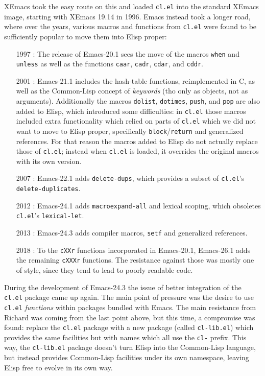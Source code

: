 \documentclass[format=acmsmall, review=false, screen=true]{acmart}
\newcommand \Elisp {Elisp}
\begin{document}
XEmacs took the easy route on this and loaded \texttt{cl.el} into the
standard XEmacs image, starting with XEmacs 19.14 in 1996.  Emacs instead
took a longer road, where over the years, various macros and functions from
\texttt{cl.el} were found to be sufficiently popular to move them into
\Elisp{} proper:

\begin{itemize}
\item [1997]: The release of Emacs-20.1 sees the move of the
  macros \texttt{when} and \texttt{unless} as well as the functions
  \texttt{caar}, \texttt{cadr}, \texttt{cdar}, and \texttt{cddr}.
\item [2001]: Emacs-21.1 includes the hash-table functions, reimplemented in
  C, as well as the Common-Lisp concept of \emph{keywords} (tho only as
  objects, not as arguments).  Additionally the macros \texttt{dolist},
  \texttt{dotimes}, \texttt{push}, and \texttt{pop} are also added to
  \Elisp{}, which introduced some difficulties: in \texttt{cl.el} those
  macros included extra functionality which relied on parts of
  \texttt{cl.el} which we did not want to move to \Elisp{} proper,
  specifically \texttt{block}/\texttt{return} and generalized references.
  For that reason the macros added to \Elisp{} do not actually replace those
  of \texttt{cl.el}; instead when \texttt{cl.el} is loaded, it overrides the
  original macros with its own version.
\item [2007]: Emacs-22.1 adds \texttt{delete-dups}, which provides a subset of
  \texttt{cl.el}'s \texttt{delete-duplicates}.
\item [2012]: Emacs-24.1 adds \texttt{macroexpand-all} and lexical scoping,
  which obsoletes \texttt{cl.el}'s \texttt{lexical-let}.
\item [2013]: Emacs-24.3 adds compiler macros, \texttt{setf} and
  generalized references.
\item [2018]: To the \texttt{cXXr} functions incorporated in Emacs-20.1,
  Emacs-26.1 adds the remaining \texttt{cXXXr} functions.  The resistance
  against those was mostly one of style, since they tend to lead to poorly
  readable code.
\end{itemize}
%
During the development of Emacs-24.3 the issue of better integration of the
\texttt{cl.el} package came up again.  The main point of pressure was the
desire to use \texttt{cl.el} \emph{functions} within packages bundled with
Emacs.  The main resistance from Richard was coming from the last point
above, but this time, a compromise was found: replace
the \texttt{cl.el} package with a new package (called \texttt{cl-lib.el})
which provides the same facilities but with names which all use the
\texttt{cl-} prefix.  This way, the \texttt{cl-lib.el} package doesn't turn
\Elisp{} into the Common-Lisp language, but instead provides Common-Lisp
facilities under its own namespace, leaving \Elisp{} free to evolve in its
own way.
\end{document}
